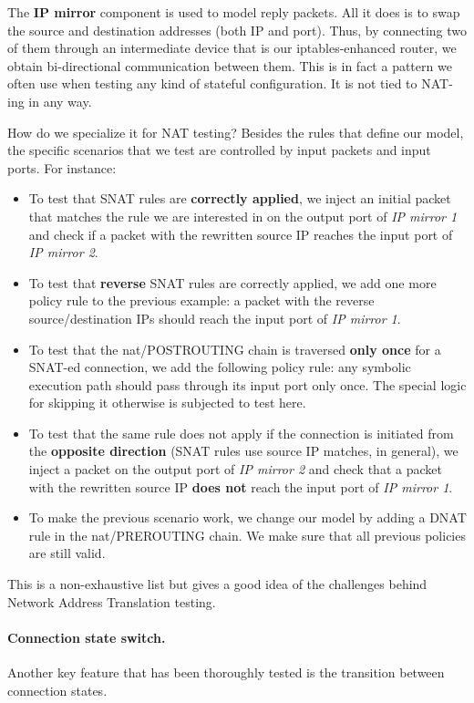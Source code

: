 The \textbf{IP mirror} component is used to model reply packets.  All it does
is to swap the source and destination addresses (both IP and port).  Thus, by
connecting two of them through an intermediate device that is our
iptables-enhanced router, we obtain bi-directional communication between them.
This is in fact a pattern we often use when testing any kind of stateful
configuration.  It is not tied to NAT-ing in any way.

How do we specialize it for NAT testing?  Besides the rules that define our
model, the specific scenarios that we test are controlled by input packets and
input ports.  For instance:
\begin{itemize}
  \item To test that SNAT rules are \textbf{correctly applied}, we inject an
    initial packet that matches the rule we are interested in on the output
    port of \emph{IP mirror 1} and check if a packet with the rewritten source
    IP reaches the input port of \emph{IP mirror 2}.
  \item To test that \textbf{reverse} SNAT rules are correctly applied, we add
    one more policy rule to the previous example: a packet with the reverse
    source/destination IPs should reach the input port of \emph{IP mirror 1}.
  \item To test that the nat/POSTROUTING chain is traversed \textbf{only once}
    for a SNAT-ed connection, we add the following policy rule: any symbolic
    execution path should pass through its input port only once.  The special
    logic for skipping it otherwise is subjected to test here.
  \item To test that the same rule does not apply if the connection is
    initiated from the \textbf{opposite direction} (SNAT rules use source IP
    matches, in general), we inject a packet on the output port of \emph{IP
    mirror 2} and check that a packet with the rewritten source IP \textbf{does
    not} reach the input port of \emph{IP mirror 1}.
  \item To make the previous scenario work, we change our model by adding a
    DNAT rule in the nat/PREROUTING chain.  We make sure that all previous
    policies are still valid.
\end{itemize}

This is a non-exhaustive list but gives a good idea of the challenges behind
Network Address Translation testing.

\paragraph{Connection state switch.}
Another key feature that has been thoroughly tested is the transition between
connection states.

